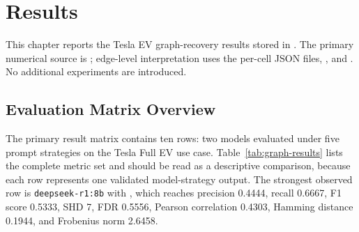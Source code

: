 \chapter{Results}
\label{sec:results}

\newcommand{\sZero}{\shortstack[l]{\texttt{S1}\\\mbox{Zero-shot}}}
\newcommand{\sControl}{\shortstack[l]{\texttt{S23}\\\mbox{No-instruction}}}
\newcommand{\sPolicy}{\shortstack[l]{\texttt{S24}\\\mbox{Policy-first}}}
\newcommand{\sLeast}{\shortstack[l]{\texttt{S25}\\\mbox{Least-to-most}}}
\newcommand{\sSkeleton}{\shortstack[l]{\texttt{S26}\\\mbox{Skeleton}}}

This chapter reports the Tesla EV graph-recovery results stored in
. The primary numerical source is
;
edge-level interpretation uses the per-cell JSON files,
, and
. No additional
experiments are introduced.


\section{Evaluation Matrix Overview}

The primary result matrix contains ten rows: two models evaluated under five
prompt strategies on the Tesla Full EV use case. Table~\ref{tab:graph-results}
lists the complete metric set and should be read as a descriptive comparison,
because each row represents one validated model-strategy output. The strongest
observed row is
\texttt{deepseek-r1:8b} with
, which reaches precision 0.4444,
recall 0.6667, F1 score 0.5333, SHD 7, FDR 0.5556, Pearson correlation
0.4303, Hamming distance 0.1944, and Frobenius norm 2.6458.

